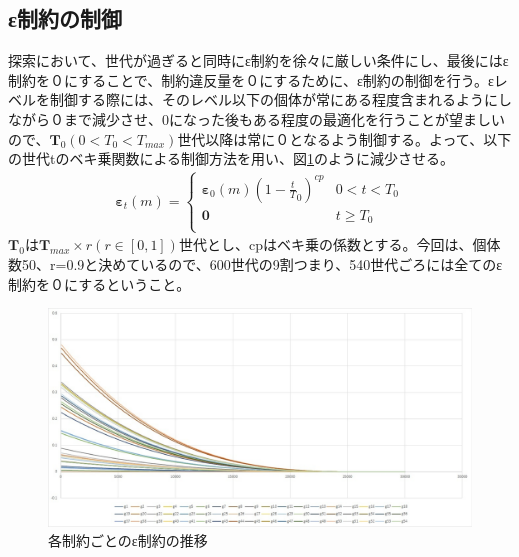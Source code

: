 \documentclass[twocolumn,10pt]{jarticle}
\begin{document}
\subsection{ε制約の制御}
探索において、世代が過ぎると同時にε制約を徐々に厳しい条件にし、最後にはε制約を０にすることで、制約違反量を０にするために、ε制約の制御を行う。εレベルを制御する際には、そのレベル以下の個体が常にある程度含まれるようにしながら０まで減少させ、0になった後もある程度の最適化を行うことが望ましいので、$\bm{T}_0(0<{T}_0<{T}_{max})$世代以降は常に０となるよう制御する。よって、以下の世代tのベキ乗関数による制御方法を用い、図\ref{fig:graph1}のように減少させる。
\begin{eqnarray}
\bm{ε}_{t}(m)=
\left\{
\begin{array}{cc}
    \bm{ε}_0(m){(1-\frac{t}{T}_0)}^{cp} & \mbox{$0<t<{T}_0$} \\
    \bm{0} & \mbox{$t\geq{T}_0$}\\
\end{array}
\right.
\end{eqnarray}
$\bm{T}_0$は$\bm{T}_{max}\times{r}(r\in[0,1])$世代とし、cpはベキ乗の係数とする。今回は、個体数50、r=0.9と決めているので、600世代の9割つまり、540世代ごろには全てのε制約を０にするということ。

\begin{figure}[htbp]
  \centering
  \includegraphics[width=.9\linewidth]{fig/test.eps}
  \caption{各制約ごとのε制約の推移}
  \label{fig:graph1}
\end{figure}
\end{document}
